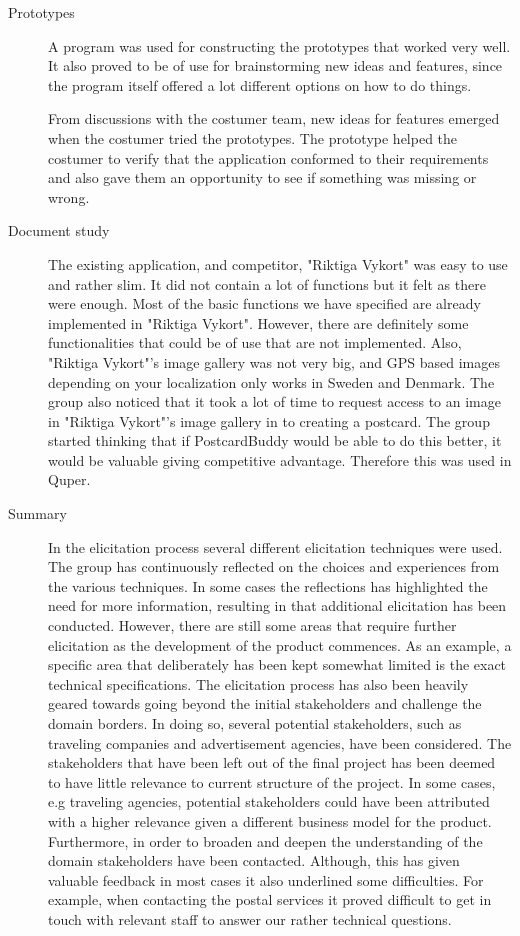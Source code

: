 \documentclass[10pt,a4paper]{article}
\begin{document}
\begin{description}
\item[Prototypes] A program was used for constructing the prototypes that worked very well. It also proved to be of use for brainstorming new ideas and features, since the program itself offered a lot different options on how to do things. 

From discussions with the costumer team, new ideas for features emerged when the costumer tried the prototypes. The prototype helped the costumer to verify that the application conformed to their requirements and also gave them an opportunity to see if something was missing or wrong.

\item[Document study] The existing application, and competitor, "Riktiga Vykort" was easy to use and rather slim. It did not contain a lot of functions but it felt as there were enough. Most of the basic functions we have specified are already implemented in "Riktiga Vykort". However, there are definitely some functionalities that could be of use that are not implemented. Also, "Riktiga Vykort"'s image gallery was not very big, and GPS based images depending on your localization only works in Sweden and Denmark. The group also noticed that it took a lot of time to request access to an image in "Riktiga Vykort"'s image gallery in to creating a postcard. The group started thinking that if PostcardBuddy would be able to do this better, it would be valuable giving competitive advantage. Therefore this was used in Quper.



\item[Summary] In the elicitation process several different elicitation techniques were used. The group has continuously reflected on the choices and experiences from the various techniques. In some cases the reflections has highlighted the need for more information, resulting in that additional elicitation has been conducted. However, there are still some areas that require further elicitation as the development of the product commences. As an example, a specific area that deliberately has been kept somewhat limited is the exact technical specifications. 
The elicitation process has also been heavily geared towards going beyond the initial stakeholders and challenge the domain borders. In doing so, several potential stakeholders, such as traveling companies and advertisement agencies, have been considered. The stakeholders that have been left out of the final project has been deemed to have little relevance to current structure of the project. In some cases, e.g traveling agencies, potential stakeholders could have been attributed with a higher relevance given a different business model for the product. Furthermore, in order to broaden and deepen the understanding of the domain stakeholders have been contacted. Although, this has given valuable feedback in most cases it also underlined some difficulties. For example, when contacting the postal services it proved difficult to get in touch with relevant staff to answer our rather technical questions. 
\end{description}
\end{document}
